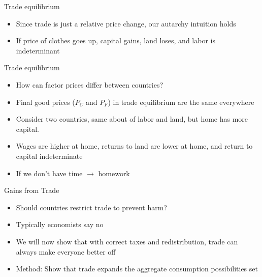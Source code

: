 \documentclass[ignorenonframetext,]{beamer}
\begin{document}
\begin{frame}{Trade equilibrium}

    \begin{itemize}
        \item Since trade is just a relative price change, our autarchy intuition holds
        \item If price of clothes goes up, capital gains, land loses, and labor is indeterminant
    \end{itemize}

\end{frame}

\begin{frame}{Trade equilibrium}

    \begin{itemize}
        \item How can factor prices differ between countries?
        \item Final good prices ($P_C$ and $P_F$) in trade equilibrium are the same everywhere
        \item Consider two countries, same about of labor and land, but home has more capital.
        \item Wages are higher at home, returns to land are lower at home, and return to capital indeterminate
        \item If we don't have time $\rightarrow$ homework
    \end{itemize}

\end{frame}

\begin{frame}{Gains from Trade}

    \begin{itemize}
        \item Should countries restrict trade to prevent harm?
        \item Typically economists say no
        \item We will now show that with correct taxes and redistribution, trade can always make everyone better off
        \item Method: Show that trade expands the aggregate consumption possibilities set
    \end{itemize}

\end{frame}
\end{document}
